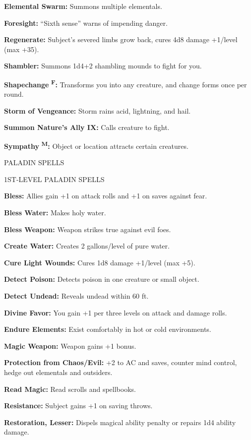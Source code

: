 \documentclass{article}
\begin{document}
\textbf{Elemental Swarm:} Summons multiple elementals.

\textbf{Foresight:} ``Sixth sense'' warns of impending danger.

\textbf{Regenerate:} Subject's severed limbs grow back, cures 4d8 damage +1/level 
(max +35).

\textbf{Shambler:} Summons 1d4+2 shambling mounds to fight for you.

\textbf{Shapechange }\textsuperscript{\textbf{F}}\textbf{:} Transforms you into 
any creature, and change forms once per round.

\textbf{Storm of Vengeance:} Storm rains acid, lightning, and hail.

\textbf{Summon Nature's Ally IX:} Calls creature to fight.

\textbf{Sympathy }\textsuperscript{\textbf{M}}\textbf{:} Object or location attracts 
certain creatures.

\vspace{12pt}
{\LARGE{}PALADIN SPELLS}

1ST-LEVEL PALADIN SPELLS

\textbf{Bless:} Allies gain +1 on attack rolls and +1 on saves against fear.

\textbf{Bless Water:} Makes holy water.

\textbf{Bless Weapon:} Weapon strikes true against evil foes.

\textbf{Create Water:} Creates 2 gallons/level of pure water.

\textbf{Cure Light Wounds:} Cures 1d8 damage +1/level (max +5).

\textbf{Detect Poison:} Detects poison in one creature or small object.

\textbf{Detect Undead:} Reveals undead within 60 ft.

\textbf{Divine Favor:} You gain +1 per three levels on attack and damage rolls.

\textbf{Endure Elements:} Exist comfortably in hot or cold environments.

\textbf{Magic Weapon:} Weapon gains +1 bonus.

\textbf{Protection from Chaos/Evil:} +2 to AC and saves, counter mind control, 
hedge out elementals and outsiders.

\textbf{Read Magic:} Read scrolls and spellbooks.

\textbf{Resistance:} Subject gains +1 on saving throws.

\textbf{Restoration, Lesser:} Dispels magical ability penalty or repairs 1d4 ability 
damage.
\end{document}
